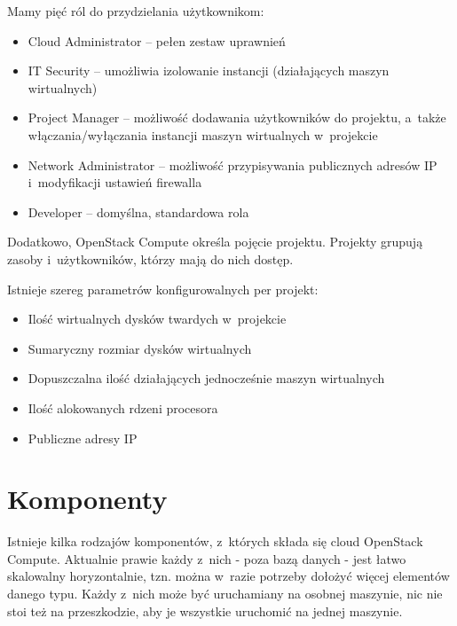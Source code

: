 Mamy pięć ról do przydzielania użytkownikom\cite{nova_manual}:

\begin{itemize}
\item Cloud Administrator -- pełen zestaw uprawnień
\item IT Security -- umożliwia izolowanie instancji (działających maszyn wirtualnych)
\item Project Manager -- możliwość dodawania użytkowników do projektu, a~także włączania/wyłączania instancji maszyn wirtualnych w~projekcie
\item Network Administrator -- możliwość przypisywania publicznych adresów IP i~modyfikacji ustawień firewalla
\item Developer -- domyślna, standardowa rola
\end{itemize}

Dodatkowo, OpenStack Compute określa pojęcie projektu. Projekty grupują zasoby i~użytkowników, którzy mają do nich dostęp.

Istnieje szereg parametrów konfigurowalnych per projekt\cite{nova_manual}:

\begin{itemize}
\item Ilość wirtualnych dysków twardych w~projekcie
\item Sumaryczny rozmiar dysków wirtualnych
\item Dopuszczalna ilość działających jednocześnie maszyn wirtualnych
\item Ilość alokowanych rdzeni procesora
\item Publiczne adresy IP
\end{itemize}

\section{Komponenty}

Istnieje kilka rodzajów komponentów, z~których składa się cloud OpenStack Compute\cite{nova_manual}.
Aktualnie prawie każdy z~nich - poza bazą danych - jest łatwo skalowalny horyzontalnie, tzn. można w~razie potrzeby dołożyć więcej elementów danego typu. Każdy z~nich może być uruchamiany na osobnej maszynie, nic nie stoi też na przeszkodzie, aby je wszystkie uruchomić na jednej maszynie.

